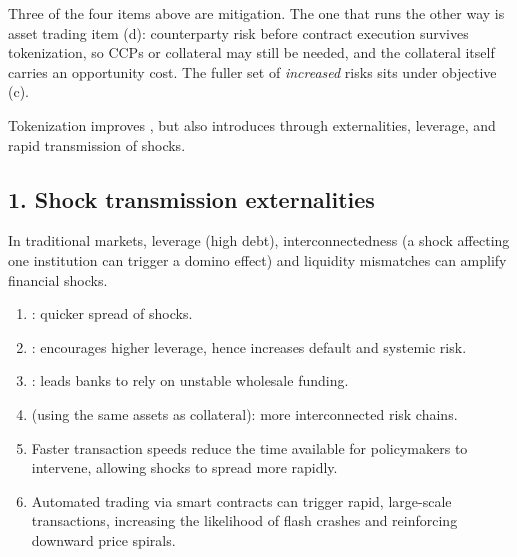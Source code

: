 \begin{citrapbox}[title={The objective says ``both increase and mitigate''}]
Three of the four items above are mitigation. The one that runs the other way is asset
trading item (d): counterparty risk before contract execution survives tokenization, so CCPs
or collateral may still be needed, and the collateral itself carries an opportunity cost. The
fuller set of \emph{increased} risks sits under objective (c).
\end{citrapbox}


Tokenization improves , but also introduces
 through externalities, leverage, and rapid transmission of shocks.

\subsection*{1. Shock transmission externalities}

In traditional markets, leverage (high debt), interconnectedness (a shock affecting one
institution can trigger a domino effect) and liquidity mismatches can amplify financial
shocks. 

\begin{enumerate}[label=\textbf{\alph*)}]
\item {}: quicker spread of shocks.
\item {}: encourages higher leverage, hence increases
default and systemic risk.
\item {}: leads banks to rely on unstable
wholesale funding.
\item {} (using the same assets as collateral): more
interconnected risk chains.
\item Faster transaction speeds reduce the time available for policymakers to intervene,
allowing shocks to spread more rapidly.
\item Automated trading via smart contracts can trigger rapid, large-scale transactions,
increasing the likelihood of flash crashes and reinforcing downward price spirals.
\end{enumerate}

